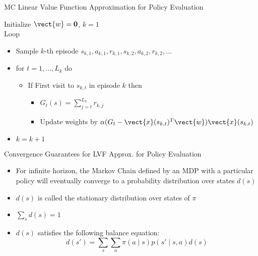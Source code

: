 \documentclass[aspectratio=169]{../latex_main/tntbeamer}  %
\begin{document}
\begin{frame}[c]{MC Linear Value Function Approximation for Policy
		Evaluation}
	

Initialize $\vect{w}= \mathbf{0}$, $k=1$\\
Loop	
	\begin{itemize}
		\item Sample $k$-th episode $s_{k,1}, a_{k,1}, r_{k,1}, s_{k,2}, a_{k,2}, r_{k,2}, \ldots$
		\item for $t=1, \ldots, L_k$ do
		\begin{itemize}
			\item If First visit to $s_{k,t}$ in episode $k$ then
			\begin{itemize}
					\item $G_t(s) = \sum_{j=t}^{L_k} r_{k,j}$
					\item Update weights by $\alpha (G_t - \vect{x}(s_{k,t})^T \vect{w}) \vect{x}(s_{k,t})$
			\end{itemize}
		\end{itemize}
	\item $k = k + 1$
	\end{itemize}
	
\end{frame}
\begin{frame}[c]{Convergence Guarantees for LVF Approx. for Policy Evaluation}
	
	\begin{itemize}
		\item For infinite horizon, the Markov Chain defined by an MDP with a particular policy will eventually converge to a probability distribution over states $d(s)$
		\item $d(s)$ is called the stationary distribution over states of $\pi$
		\item $\sum_{s} d(s) = 1$
		\item $d(s)$ satisfies the following balance equation:
		$$ d(s') = \sum_{s} \sum_{a} \pi(a \mid s) p(s' \mid s,a) d(s) $$
	\end{itemize}
	
\end{frame}
\end{document}
